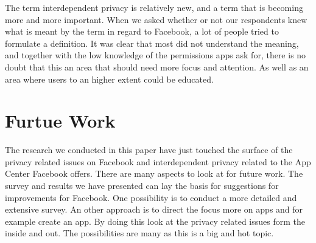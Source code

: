 The term interdependent privacy is relatively new, and a term that is becoming more and more important. When we asked whether or not our respondents knew what is meant by the term in regard to Facebook, a lot of people tried to formulate a definition. It was clear that most did not understand the meaning, and together with the low knowledge of the permissions apps ask for, there is no doubt that this an area that should need more focus and attention. As well as an area where users to an higher extent could be educated. 

\section{Furtue Work}
The research we conducted in this paper have just touched the surface of the privacy related issues on Facebook and interdependent privacy related to the App Center Facebook offers. There are many aspects to look at for future work. The survey and results we have presented can lay the basis for suggestions for improvements for Facebook. One possibility is to conduct a more detailed and extensive survey. An other approach is to direct the focus more on apps and for example create an app. By doing this look at the privacy related issues form the inside and out. The possibilities are many as this is a big and hot topic. 


